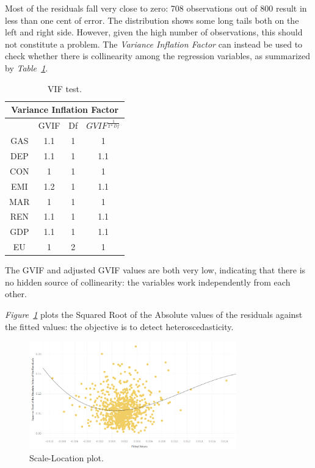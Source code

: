 \documentclass[a4paper,12pt]{book}
\begin{document}
Most of the residuals fall very close to zero: 708 observations out of 800 result in less than one cent of error. The distribution shows some long tails both on the left and right side. However, given the high number of observations, this should not constitute a problem. The \textit{Variance Inflation Factor} can instead be used to check whether there is collinearity among the regression variables, as summarized by \textit{Table~\ref{Tab:coll}}.

\begin{table}[tb]
\begin{center}
\begin{tabular}{|c|c|c|c|}
\hline
\multicolumn{4}{|c|}{Variance Inflation Factor}\\
\hline
&GVIF&Df&$GVIF^{\frac{1}{2*Df}}$\\
\hline
GAS&1.1&1&1\\
DEP&1.1&1&1.1\\
CON&1&1&1\\
EMI&1.2&1&1.1\\
MAR&1&1&1\\
REN&1.1&1&1.1\\
GDP&1.1&1&1.1\\
EU&1&2&1\\
\hline
\end{tabular}
\caption{VIF test.}
\label{Tab:coll}
\end{center}
\end{table}

The GVIF and adjusted GVIF values are both very low, indicating that there is no hidden source of collinearity: the variables work independently from each other.

\textit{Figure~\ref{fig:hetero}} plots the Squared Root of the Absolute values of the residuals against the fitted values: the objective is to detect heteroscedasticity.

\begin{figure}[tb]
\begin{center}
\captionsetup{justification=centering}
\includegraphics[width=0.8\textwidth]{Images/hetero.png}
\caption{Scale-Location plot.}
\label{fig:hetero}
\end{center}
\end{figure}
\end{document}

